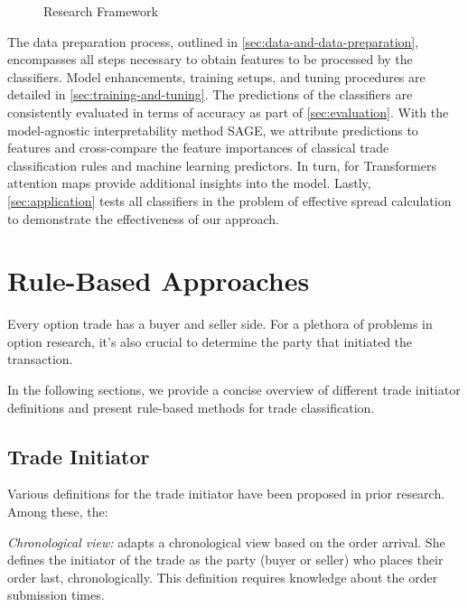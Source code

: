 \begin{figure}[!ht]
    \centering
    {\renewcommand\normalsize{\tiny}
    \normalsize
    }
    \caption[Research Framework]{Research Framework}
    \label{fig:research-framework}
\end{figure}

The data preparation process, outlined in \cref{sec:data-and-data-preparation}, encompasses all steps necessary to obtain features to be processed by the classifiers. Model enhancements, training setups, and tuning procedures are detailed in \cref{sec:training-and-tuning}. The predictions of the classifiers are consistently evaluated in terms of accuracy as part of \cref{sec:evaluation}. With the model-agnostic interpretability method \gls{SAGE}, we attribute predictions to features and cross-compare the feature importances of classical trade classification rules and machine learning predictors. In turn, for Transformers attention maps provide additional insights into the model. Lastly, \cref{sec:application} tests all classifiers in the problem of 
effective spread calculation to demonstrate the effectiveness of our approach.

\newpage

\section{Rule-Based Approaches}\label{sec:rule-based-approaches}

Every option trade has a buyer and seller side. For a plethora of problems in option research, it’s also crucial to determine the party that initiated the transaction.

In the following sections, we provide a concise overview of different trade initiator definitions and present rule-based methods for trade classification.

\subsection{Trade Initiator}
\label{sec:trade-initiator}

Various definitions for the trade initiator have been proposed in prior
research. Among these, the:

\emph{Chronological view:} \textcite[][267]{odders-whiteOccurrenceConsequencesInaccurate2000} adapts a chronological view based on the order arrival. She defines the initiator of the trade as the party (buyer or seller) who places their order last, chronologically. This definition requires knowledge about the order submission times.

